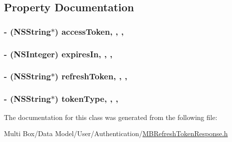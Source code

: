 \subsection{Property Documentation}
\hypertarget{interface_m_b_refresh_token_response_aae7d6df5c0e6da13e80b3ddb82ae7081}{
\subsubsection[{access\-Token}]{\setlength{\rightskip}{0pt plus 5cm}-\/ (N\-S\-String$\ast$) access\-Token\hspace{0.3cm}{\ttfamily [read]}, {\ttfamily [write]}, {\ttfamily [nonatomic]}, {\ttfamily [strong]}}}\label{interface_m_b_refresh_token_response_aae7d6df5c0e6da13e80b3ddb82ae7081}
\hypertarget{interface_m_b_refresh_token_response_ae251d07feaa95423629811e829c40f0a}{
\subsubsection[{expires\-In}]{\setlength{\rightskip}{0pt plus 5cm}-\/ (N\-S\-Integer) expires\-In\hspace{0.3cm}{\ttfamily [read]}, {\ttfamily [write]}, {\ttfamily [nonatomic]}, {\ttfamily [assign]}}}\label{interface_m_b_refresh_token_response_ae251d07feaa95423629811e829c40f0a}
\hypertarget{interface_m_b_refresh_token_response_a52a523200e9ed6203d66dc7250c725dd}{
\subsubsection[{refresh\-Token}]{\setlength{\rightskip}{0pt plus 5cm}-\/ (N\-S\-String$\ast$) refresh\-Token\hspace{0.3cm}{\ttfamily [read]}, {\ttfamily [write]}, {\ttfamily [nonatomic]}, {\ttfamily [strong]}}}\label{interface_m_b_refresh_token_response_a52a523200e9ed6203d66dc7250c725dd}
\hypertarget{interface_m_b_refresh_token_response_aebb1b1ab373299d1bbcb8edacfc117c2}{
\subsubsection[{token\-Type}]{\setlength{\rightskip}{0pt plus 5cm}-\/ (N\-S\-String$\ast$) token\-Type\hspace{0.3cm}{\ttfamily [read]}, {\ttfamily [write]}, {\ttfamily [nonatomic]}, {\ttfamily [strong]}}}\label{interface_m_b_refresh_token_response_aebb1b1ab373299d1bbcb8edacfc117c2}


The documentation for this class was generated from the following file\-:\begin{DoxyCompactItemize}
\item 
Multi Box/\-Data Model/\-User/\-Authentication/\hyperlink{_m_b_refresh_token_response_8h}{M\-B\-Refresh\-Token\-Response.\-h}\end{DoxyCompactItemize}
